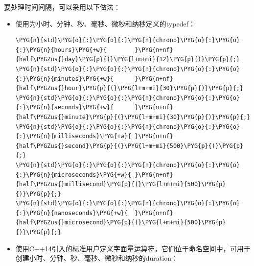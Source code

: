 
要处理时间间隔，可以采用以下做法：



\begin{itemize}
\item 使用为小时、分钟、秒、毫秒、微秒和纳秒定义的typedef：



\begin{codeblockbg}
\begin{Verbatim}[commandchars=\\\{\},breaklines=true,breakanywhere=true,fontsize=\codefont,xleftmargin=17bp]
\PYG{n}{std}\PYG{o}{:}\PYG{o}{:}\PYG{n}{chrono}\PYG{o}{:}\PYG{o}{:}\PYG{n}{hours}\PYG{+w}{        }\PYG{n+nf}{half\PYGZus{}day}\PYG{p}{(}\PYG{l+m+mi}{12}\PYG{p}{)}\PYG{p}{;}
\PYG{n}{std}\PYG{o}{:}\PYG{o}{:}\PYG{n}{chrono}\PYG{o}{:}\PYG{o}{:}\PYG{n}{minutes}\PYG{+w}{      }\PYG{n+nf}{half\PYGZus{}hour}\PYG{p}{(}\PYG{l+m+mi}{30}\PYG{p}{)}\PYG{p}{;}
\PYG{n}{std}\PYG{o}{:}\PYG{o}{:}\PYG{n}{chrono}\PYG{o}{:}\PYG{o}{:}\PYG{n}{seconds}\PYG{+w}{      }\PYG{n+nf}{half\PYGZus{}minute}\PYG{p}{(}\PYG{l+m+mi}{30}\PYG{p}{)}\PYG{p}{;}
\PYG{n}{std}\PYG{o}{:}\PYG{o}{:}\PYG{n}{chrono}\PYG{o}{:}\PYG{o}{:}\PYG{n}{milliseconds}\PYG{+w}{ }\PYG{n+nf}{half\PYGZus{}second}\PYG{p}{(}\PYG{l+m+mi}{500}\PYG{p}{)}\PYG{p}{;}
\PYG{n}{std}\PYG{o}{:}\PYG{o}{:}\PYG{n}{chrono}\PYG{o}{:}\PYG{o}{:}\PYG{n}{microseconds}\PYG{+w}{ }\PYG{n+nf}{half\PYGZus{}millisecond}\PYG{p}{(}\PYG{l+m+mi}{500}\PYG{p}{)}\PYG{p}{;}
\PYG{n}{std}\PYG{o}{:}\PYG{o}{:}\PYG{n}{chrono}\PYG{o}{:}\PYG{o}{:}\PYG{n}{nanoseconds}\PYG{+w}{  }\PYG{n+nf}{half\PYGZus{}microsecond}\PYG{p}{(}\PYG{l+m+mi}{500}\PYG{p}{)}\PYG{p}{;}
\end{Verbatim}
\end{codeblockbg}



\item 使用C++14引入的标准用户定义字面量运算符，它们位于命名空间中，可用于创建小时、分钟、秒、毫秒、微秒和纳秒的duration：




\end{itemize}
